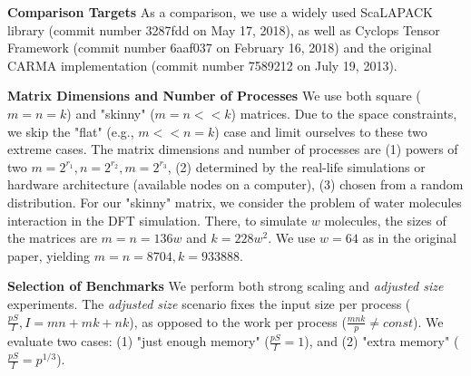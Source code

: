 \documentclass[sigplan,review,anonymous]{acmart}\settopmatter{printfolios=true,printccs=false,printacmref=false}
\newcommand\mac[1]{\textcolor{red}{[Mac: #1]}}
\newcommand{\macb}[1]{\textbf{\textsf{#1}}}
\begin{document}
\macb{Comparison Targets}
%
As a comparison, we use a widely used ScaLAPACK library (commit number 3287fdd 
on May 17, 2018), as well 
as Cyclops Tensor Framework (commit number 6aaf037 on February 16, 2018) and 
the original CARMA implementation (commit number 7589212 on July 19, 2013).

\macb{Matrix Dimensions and Number of Processes}
We use both square ($m = n = k$) and "skinny" ($m = n << k$) matrices. Due to 
the space constraints, we skip the "flat" (e.g., $m << n = k$) case and limit 
ourselves to these two extreme cases. The matrix dimensions and number of 
processes are (1) powers of 
two $m = 2^{r_1}, n = 2^{r_2}, m = 2^{r_3}$, (2) determined by the real-life 
simulations or hardware architecture (available nodes on a computer), (3) 
chosen from a random distribution. 
For our "skinny" matrix, we consider the problem of 
water 
molecules interaction in the DFT
simulation\cite{joost}. There, to simulate $w$ molecules, the sizes 
of the 
matrices are $m=n=136w$ and $k = 228w^2$. We use $w=64$ as in the 
original paper, yielding $m=n=8704, k = 933888$.

\macb{Selection of Benchmarks}
%
We perform both strong scaling and \emph{adjusted size} experiments. 
The \emph{adjusted size} scenario fixes the input size per process 
($\frac{pS}{I}, I = mn + mk + nk$), as opposed to the work per 
process ($\frac{mnk}{p} \ne const$). We evaluate two cases: (1) "just enough 
memory" ($\frac{pS}{I} = 1$), and (2) "extra memory"  ($\frac{pS}{I} = 
p^{1/3}$).
%
%
%
\end{document}

